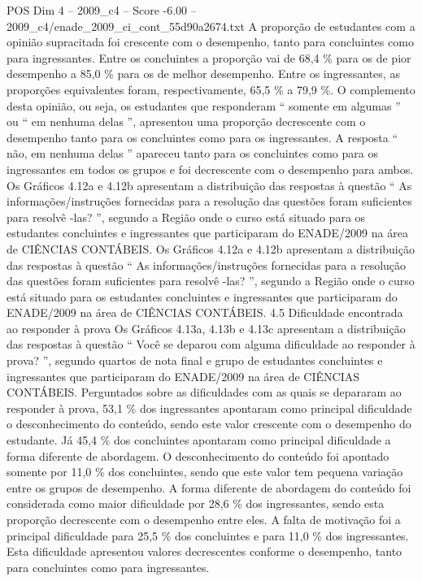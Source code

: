 \begin{textsample}{POS Dim 4 – 2009\_c4 – Score -6.00 – 2009\_c4/enade\_2009\_ci\_cont\_55d90a2674.txt}
A proporção de estudantes com a opinião supracitada foi crescente com o desempenho, tanto para concluintes como para ingressantes.
Entre os concluintes a proporção vai de 68,4 \% para os de pior desempenho a 85,0 \% para os de melhor desempenho.
Entre os ingressantes, as proporções equivalentes foram, respectivamente, 65,5 \% a 79,9 \%.
O complemento desta opinião, ou seja, os estudantes que responderam “ somente em algumas ” ou “ em nenhuma delas ”, apresentou uma proporção decrescente com o desempenho tanto para os concluintes como para os ingressantes.
A resposta “ não, em nenhuma delas ” apareceu tanto para os concluintes como para os ingressantes em todos os grupos e foi decrescente com o desempenho para ambos.
Os Gráficos 4.12a e 4.12b apresentam a distribuição das respostas à questão “ As informações/instruções fornecidas para a resolução das questões foram suficientes para resolvê -las? ”, segundo a Região onde o curso está situado para os estudantes concluintes e ingressantes que participaram do ENADE/2009 na área de CIÊNCIAS CONTÁBEIS.
Os Gráficos 4.12a e 4.12b apresentam a distribuição das respostas à questão “ As informações/instruções fornecidas para a resolução das questões foram suficientes para resolvê -las? ”, segundo a Região onde o curso está situado para os estudantes concluintes e ingressantes que participaram do ENADE/2009 na área de CIÊNCIAS CONTÁBEIS. 4.5 Dificuldade encontrada ao responder à prova Os Gráficos 4.13a, 4.13b e 4.13c apresentam a distribuição das respostas à questão “ Você se deparou com alguma dificuldade ao responder à prova? ”, segundo quartos de nota final e grupo de estudantes concluintes e ingressantes que participaram do ENADE/2009 na área de CIÊNCIAS CONTÁBEIS.
Perguntados sobre as dificuldades com as quais se depararam ao responder à prova, 53,1 \% dos ingressantes apontaram como principal dificuldade o desconhecimento do conteúdo, sendo este valor crescente com o desempenho do estudante.
Já 45,4 \% dos concluintes apontaram como principal dificuldade a forma diferente de abordagem.
O desconhecimento do conteúdo foi apontado somente por 11,0 \% dos concluintes, sendo que este valor tem pequena variação entre os grupos de desempenho.
A forma diferente de abordagem do conteúdo foi considerada como maior dificuldade por 28,6 \% dos ingressantes, sendo esta proporção decrescente com o desempenho entre eles.
A falta de motivação foi a principal dificuldade para 25,5 \% dos concluintes e para 11,0 \% dos ingressantes.
Esta dificuldade apresentou valores decrescentes conforme o desempenho, tanto para concluintes como para ingressantes.

\end{textsample}
